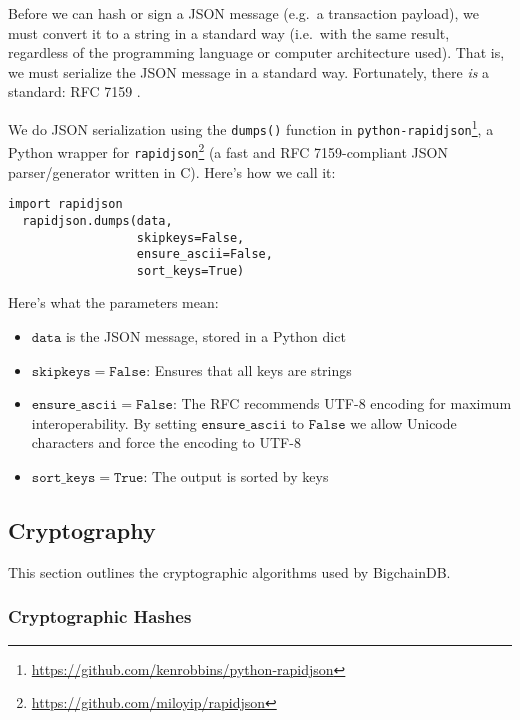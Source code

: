 Before we can hash or sign a JSON message (e.g.~a transaction payload), we must convert it to a string in a standard way (i.e.~with the same result, regardless of the programming language or computer architecture used). That is, we must serialize the JSON message in a standard way. Fortunately, there \emph{is} a standard: RFC 7159 \cite{RFC7159}.

We do JSON serialization using the \texttt{dumps()} function in \texttt{python-rapidjson}\footnote{\url{https://github.com/kenrobbins/python-rapidjson}}, a Python wrapper for \texttt{rapidjson}\footnote{\url{https://github.com/miloyip/rapidjson}} (a fast and RFC 7159-compliant JSON parser/generator written in C\nolinebreak[4]\hspace{-.05em}\raisebox{.4ex}{\tiny\bfseries ++}). Here's how we call it:

\medskip
\begin{minipage}{\linewidth}
  \begin{lstlisting}[style=python]
  import rapidjson 
  rapidjson.dumps(data, 
                  skipkeys=False, 
                  ensure_ascii=False, 
                  sort_keys=True)\end{lstlisting}
\end{minipage}

\medskip
\noindent Here's what the parameters mean: 
\begin{itemize}
 \item $\mathtt{data}$ is the JSON message, stored in a Python dict
 \item $\mathtt{skipkeys = False}$: Ensures that all keys are strings
 \item $\mathtt{ensure\_ascii = False}$: The RFC recommends UTF-8 encoding for maximum interoperability. By setting $\mathtt{ensure\_ascii}$ to $\mathtt{False}$ we allow Unicode characters and force the encoding to UTF-8
 \item $\mathtt{sort\_keys = True}$: The output is sorted by keys
\end{itemize}


\subsection{Cryptography}

This section outlines the cryptographic algorithms used by BigchainDB.

\subsubsection{Cryptographic Hashes}

